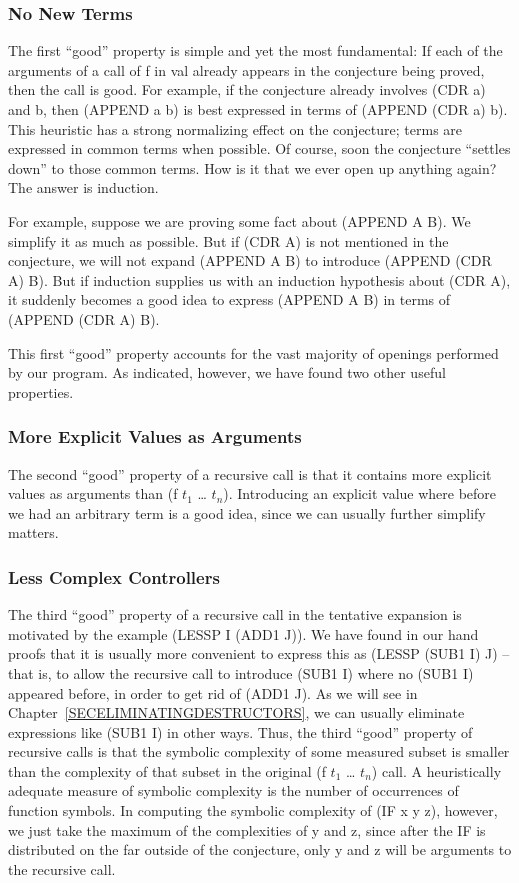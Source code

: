 \documentclass[11pt]{book}
\newcommand{\pubdefaulttextsize}{\large}
\begin{document}
\subsubsection{No New Terms}
\pubdefaulttextsize
The first ``good'' property is simple and yet the most fundamental:
If each of the arguments of a call of f in val already appears
in the conjecture being proved, then the call is good.
For example, if the conjecture already involves
(CDR a) and b, then (APPEND a b) is best expressed in terms of (APPEND (CDR a) b).
This heuristic has a strong normalizing effect on the conjecture;
terms are expressed in common terms when possible.  Of course,
soon the conjecture ``settles down'' to those common terms.
How  is it that we ever open up anything again?  The answer is induction.

For example, suppose we are proving some fact about (APPEND A B).
We  simplify it as much as possible.  But if (CDR A) is not 
mentioned in  the conjecture, we will not
expand (APPEND A B) to introduce (APPEND (CDR A) B).  But if induction
supplies us with an induction hypothesis about (CDR A), it suddenly
becomes a good idea to express (APPEND A B) in terms of (APPEND (CDR A) B).

This first ``good'' property accounts for
the vast majority of openings performed by our program.  As indicated, however, we have
found two other useful properties.
\subsubsection{More Explicit Values as Arguments}
\pubdefaulttextsize
The second ``good'' property of a recursive call is that it contains
more explicit values as arguments than (f $t_{1}$ \ldots{} $t_{n}$).  Introducing
an explicit value where before we had an arbitrary term is a good idea,
since we can usually further simplify matters.
\subsubsection{Less Complex Controllers}
\pubdefaulttextsize
The third ``good'' property of a recursive call in the tentative expansion
is motivated by the example (LESSP I (ADD1 J)).  We have
found in our hand proofs that it is usually more convenient to express
this as (LESSP (SUB1 I) J) -- that is, to allow the recursive call to introduce
(SUB1 I) where no (SUB1 I) appeared before, in order to get rid of (ADD1 J).
As we will see in Chapter~\ref{SECELIMINATINGDESTRUCTORS},
we can usually eliminate expressions like (SUB1 I) in other ways.  Thus,
the third ``good'' property of recursive calls is that the symbolic complexity
of some measured subset is smaller than the complexity of that subset in
the original (f $t_{1}$ \ldots{} $t_{n}$) call.  A heuristically adequate measure
of symbolic complexity is the number of occurrences of
function symbols.  In
computing the symbolic complexity of (IF x y z), however, we just take the
maximum of the complexities of y and z, since after the IF is distributed on the
far outside of the conjecture, only y and z will be arguments to the recursive
call.
\end{document}
